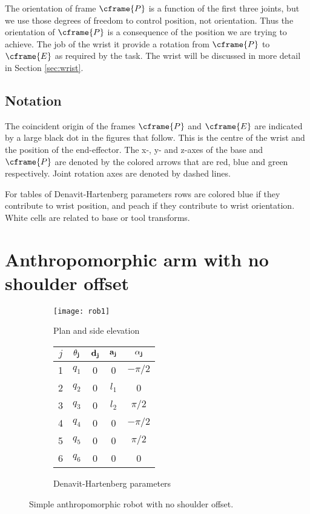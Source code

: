 \documentclass[11pt]{article}
\numberwithin{equation}{section}
\begin{document}
The orientation of frame $\cframe{P}$ is a function of the first three joints, but we use those degrees of freedom to control position, not orientation.  Thus the orientation of $\cframe{P}$ is a consequence of the position we are trying to achieve.  The job of the wrist it provide a rotation from
$\cframe{P}$ to $\cframe{E}$ as required by the task.  The wrist will be discussed in more
detail in Section \ref{sec:wrist}.


\subsection*{Notation}
The coincident origin of the frames
$\cframe{P}$ and $\cframe{E}$ are  indicated by a large black dot in the figures that follow.  This is the centre of the wrist and the position
of the end-effector.
The x-, y- and z-axes of the base and $\cframe{P}$ are denoted by the colored
arrows that are red, blue and green respectively.  Joint rotation axes are denoted by dashed lines.

For tables of Denavit-Hartenberg parameters rows are colored blue if they contribute to wrist position, and peach if they
contribute to wrist orientation.  White cells are related to base or tool transforms.

\tableofcontents
\pagebreak
\section{Anthropomorphic arm with no shoulder offset}

	\begin{figure}[h]
	\centering
	\begin{subfigure}[b]{0.6\textwidth}
		\texttt{[image: rob1]}
		\caption{Plan and side elevation}
		\label{fig:rob1}
	\end{subfigure}
	\begin{subfigure}[b]{0.3\textwidth}
		\begin{tabular}{|c|c|c|c|c|} \hline
			$j$ & $\bf \theta_j$ & $\bf d_j$ & $\bf a_j$ & $\bf \alpha_j$ \\ \hline
			\rowcolor{SkyBlue}1 &  $q_1$ & \cellcolor{White} 0 &  0& $-\pi/2$ \\
			\rowcolor{SkyBlue}2 &  $q_2$ & 0& $l_1$& 0 \\
			\rowcolor{SkyBlue}3 & $q_3$ & 0 &$l_2$  & $\pi/2$ \\
			\rowcolor{Peach}4 &  $q_4$ & 0 & 0 & $-\pi/2$ \\
			\rowcolor{Peach}5&  $q_5$ & 0 & 0 & $\pi/2$ \\
			\cellcolor{Peach}6 &  \cellcolor{Peach} $q_6$ &0  &0  & 0 \\ \hline
		\end{tabular}
		\caption{Denavit-Hartenberg parameters}
		\label{fig:dh1}
	\end{subfigure}

	\caption{Simple anthropomorphic robot with no shoulder offset.  }
	\end{figure}
\end{document}
